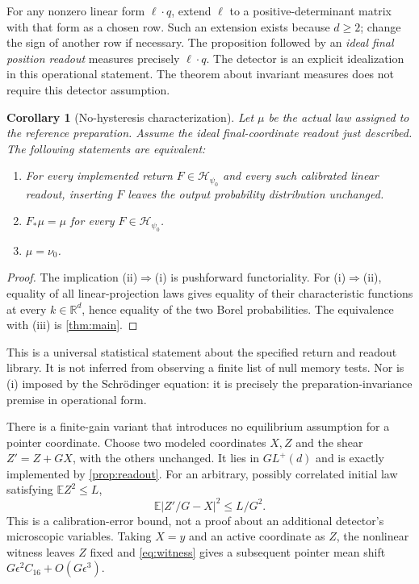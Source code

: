 \documentclass[11pt]{article}
\numberwithin{equation}{section}
\newtheorem{corollary}[corollary]{Corollary}
\theoremstyle{definition}
\newcommand{\R}{\mathbb R}
\newcommand{\calH}{\mathcal H}
\begin{document}
For any nonzero linear form $\ell\cdot q$, extend $\ell$ to a
positive-determinant matrix with that form as a chosen row.
Such an extension exists because $d\geq2$; change the sign of
another row if necessary. The proposition followed by an
\emph{ideal final position readout} measures precisely $\ell\cdot q$.
The detector is an explicit idealization in this operational
statement. The theorem about invariant measures does not require
this detector assumption.

\begin{corollary}[No-hysteresis characterization]\label{cor:nohysteresis}
Let $\mu$ be the actual law assigned to the reference preparation.
Assume the ideal final-coordinate readout just described.
The following statements are equivalent:
\begin{enumerate}[label=(\roman*)]
 \item For every implemented return $F\in\calH_{\psi_0}$ and every
 such calibrated linear readout, inserting $F$ leaves the output
 probability distribution unchanged.
 \item $F_*\mu=\mu$ for every $F\in\calH_{\psi_0}$.
 \item $\mu=\nu_0$.
\end{enumerate}
\end{corollary}

\begin{proof}
The implication (ii)$\Rightarrow$(i) is pushforward functoriality.
For (i)$\Rightarrow$(ii), equality of all linear-projection laws
gives equality of their characteristic functions at every
$k\in\R^d$, hence equality of the two Borel probabilities.
The equivalence with (iii) is \cref{thm:main}.
\end{proof}

This is a universal statistical statement about the specified
return and readout library. It is not inferred from observing a
finite list of null memory tests. Nor is (i) imposed by the
Schr\"odinger equation: it is precisely the preparation-invariance
premise in operational form.

There is a finite-gain variant that introduces no equilibrium
assumption for a pointer coordinate. Choose two modeled coordinates
$X,Z$ and the shear $Z'=Z+GX$, with the others unchanged.
It lies in $GL^+(d)$ and is exactly implemented by
\cref{prop:readout}. For an arbitrary, possibly correlated initial
law satisfying $\mathbb E Z^2\leq L$,
\[
 \mathbb E|Z'/G-X|^2\leq L/G^2 .
\]
This is a calibration-error bound, not a proof about an additional
detector's microscopic variables. Taking $X=y$ and an active
coordinate as $Z$, the nonlinear witness leaves $Z$ fixed and
\eqref{eq:witness} gives a subsequent pointer mean shift
$G\epsilon^2C_{16}+O(G\epsilon^3)$.
\end{document}

